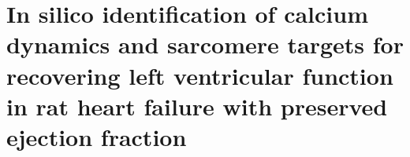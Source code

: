 \chapter{In silico identification of calcium dynamics and sarcomere targets for recovering left ventricular function in rat heart failure with preserved ejection fraction}\label{cha:chapter7}
